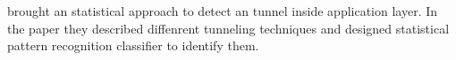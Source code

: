  \cite{dusi2009tunnel} brought an statistical approach 
to detect an tunnel inside application layer.
In the paper they described diffenrent tunneling techniques and designed statistical pattern recognition 
classifier to identify them. 
%


